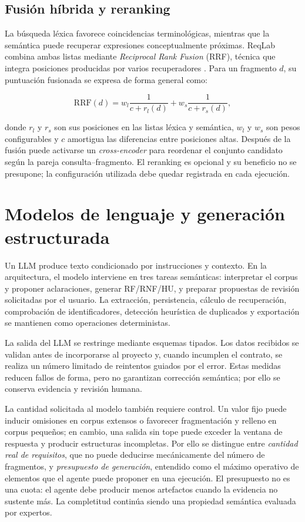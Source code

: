 \subsection{Fusión híbrida y reranking}

La búsqueda léxica favorece coincidencias terminológicas, mientras que la semántica puede recuperar expresiones conceptualmente próximas. ReqLab combina ambas listas mediante \emph{Reciprocal Rank Fusion} (RRF), técnica que integra posiciones producidas por varios recuperadores \cite{cormack2009}. Para un fragmento \(d\), su puntuación fusionada se expresa de forma general como:

\begin{equation}
  \mathrm{RRF}(d)=
  w_l\frac{1}{c+r_l(d)}+
  w_s\frac{1}{c+r_s(d)},
\end{equation}

donde \(r_l\) y \(r_s\) son sus posiciones en las listas léxica y semántica, \(w_l\) y \(w_s\) son pesos configurables y \(c\) amortigua las diferencias entre posiciones altas. Después de la fusión puede activarse un \emph{cross-encoder} para reordenar el conjunto candidato según la pareja consulta--fragmento. El reranking es opcional y su beneficio no se presupone; la configuración utilizada debe quedar registrada en cada ejecución.

\section{Modelos de lenguaje y generación estructurada}

Un LLM produce texto condicionado por instrucciones y contexto. En la arquitectura, el modelo interviene en tres tareas semánticas: interpretar el corpus y proponer aclaraciones, generar RF/RNF/HU, y preparar propuestas de revisión solicitadas por el usuario. La extracción, persistencia, cálculo de recuperación, comprobación de identificadores, detección heurística de duplicados y exportación se mantienen como operaciones deterministas.

La salida del LLM se restringe mediante esquemas tipados. Los datos recibidos se validan antes de incorporarse al proyecto y, cuando incumplen el contrato, se realiza un número limitado de reintentos guiados por el error. Estas medidas reducen fallos de forma, pero no garantizan corrección semántica; por ello se conserva evidencia y revisión humana.

La cantidad solicitada al modelo también requiere control. Un valor fijo puede inducir omisiones en corpus extensos o favorecer fragmentación y relleno en corpus pequeños; en cambio, una salida sin tope puede exceder la ventana de respuesta y producir estructuras incompletas. Por ello se distingue entre \emph{cantidad real de requisitos}, que no puede deducirse mecánicamente del número de fragmentos, y \emph{presupuesto de generación}, entendido como el máximo operativo de elementos que el agente puede proponer en una ejecución. El presupuesto no es una cuota: el agente debe producir menos artefactos cuando la evidencia no sustente más. La completitud continúa siendo una propiedad semántica evaluada por expertos.


